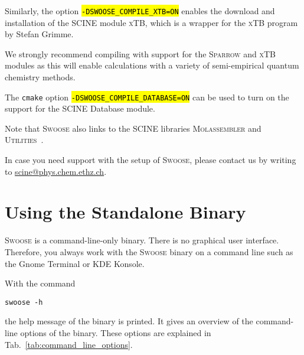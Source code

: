 \documentclass[]{tufte-book}
\begin{document}
Similarly, the option \hl{\:\texttt{-DSWOOSE\_COMPILE\_XTB=ON}\:} enables the download and installation of the SCINE module \textsc{xTB}, which is a wrapper for the \textsc{xTB} program\cite{bannwarth20} by Stefan Grimme.

We strongly recommend compiling with support for the \textsc{Sparrow} and \textsc{xTB} modules as this will enable calculations with a variety of semi-empirical quantum chemistry methods.

\newpage %
The \texttt{cmake} option \hl{\:\texttt{-DSWOOSE\_COMPILE\_DATABASE=ON}\:} can be used to turn on the support for the SCINE Database module.

Note that \textsc{Swoose} also links to the SCINE libraries \textsc{Molassembler}\cite{molassembler} and \textsc{Utilities}~\cite{utils}.

In case you need support with the setup of \textsc{Swoose}, please contact us by writing to \href{scine@phys.chem.ethz.ch}{scine@phys.chem.ethz.ch}.

\chapter{Using the Standalone Binary}\label{ch:use_binary}

\textsc{Swoose} is a command-line-only binary. There is no graphical user interface. Therefore, you always work with the
\textsc{Swoose} binary on a command line such as the Gnome Terminal or KDE Konsole.

With the command
\begin{mdframed}[backgroundcolor=LightSteelBlue!25, linewidth=0pt]
\begin{verbatim}
swoose -h
\end{verbatim}
\end{mdframed}
the help message of the binary is printed. It gives an overview of the command-line
options of the binary. These options are explained in Tab.~\ref{tab:command_line_options}.
\end{document}
